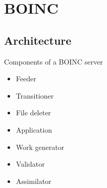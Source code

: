 \section{BOINC}

\subsection{Architecture}

Components of a BOINC server
\begin{itemize}
	\item Feeder
	\item Transitioner
	\item File deleter
	\item Application
	\item Work generator
	\item Validator
	\item Assimilator
\end{itemize}

